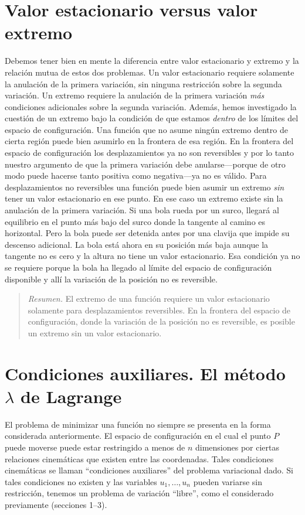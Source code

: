 \documentclass[12pt,a4paper]{book}
\begin{document}
\section{Valor estacionario versus valor extremo}

Debemos tener bien en mente la diferencia entre valor estacionario y extremo y la relación mutua de estos dos problemas. Un valor estacionario requiere solamente la anulación de la primera variación, sin ninguna restricción sobre la segunda variación. Un extremo requiere la anulación de la primera variación \textit{más} condiciones adicionales sobre la segunda variación. Además, hemos investigado la cuestión de un extremo bajo la condición de que estamos \textit{dentro} de los límites del espacio de configuración. Una función que no asume ningún extremo dentro de cierta región puede bien asumirlo en la frontera de esa región. En la frontera del espacio de configuración los desplazamientos ya no son reversibles y por lo tanto nuestro argumento de que la primera variación debe anularse---porque de otro modo puede hacerse tanto positiva como negativa---ya no es válido. Para desplazamientos no reversibles una función puede bien asumir un extremo \textit{sin} tener un valor estacionario en ese punto. En ese caso un extremo existe sin la anulación de la primera variación. Si una bola rueda por un surco, llegará al equilibrio en el punto más bajo del surco donde la tangente al camino es horizontal. Pero la bola puede ser detenida antes por una clavija que impide su descenso adicional. La bola está ahora en su posición más baja aunque la tangente no es cero y la altura no tiene un valor estacionario. Esa condición ya no se requiere porque la bola ha llegado al límite del espacio de configuración disponible y allí la variación de la posición no es reversible.

\begin{quote}
\textit{Resumen.} El extremo de una función requiere un valor estacionario solamente para desplazamientos reversibles. En la frontera del espacio de configuración, donde la variación de la posición no es reversible, es posible un extremo sin un valor estacionario.
\end{quote}

\section{Condiciones auxiliares. El método $\lambda$ de Lagrange}

El problema de minimizar una función no siempre se presenta en la forma considerada anteriormente. El espacio de configuración en el cual el punto $P$ puede moverse puede estar restringido a menos de $n$ dimensiones por ciertas relaciones cinemáticas que existen entre las coordenadas. Tales condiciones cinemáticas se llaman ``condiciones auxiliares'' del problema variacional dado. Si tales condiciones no existen y las variables $u_1, \ldots, u_n$ pueden variarse sin restricción, tenemos un problema de variación ``libre'', como el considerado previamente (secciones 1--3).
\end{document}
